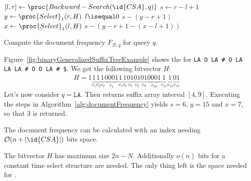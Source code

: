 \begin{algorithm}[htb]
  \begin{codebox}
    \li $[l,r] \gets \proc{Backward-Search(\id{CSA}, q)}$
    \li $s \gets r - l + 1$
    \li $y \gets \proc{Select}_1(r, H)$
    \li \If $l \isequal 0$
        \Then
    \li   \Return $s - (y - r + 1)$
    \li \Else
    \li   $x \gets \proc{Select}_1(l, H)$
    \li   \Return $s - (y - r + 1 - (x - l + 1))$
        \End
  \end{codebox}
  \caption{Compute the document frequency $F_{\mathcal{D},q}$ for query $q$.}
  \label{alg:documentFrequency}
\end{algorithm}

\begin{Example}
  Figure~\ref{fig:binaryGeneralizedSuffixTreeExample} shows the  for \texttt{LA O LA \# O LA LA LA \# O O LA \# \$}. We get the following bitvector $H$:
  \begin{align*}
    H = 1
    \underbrace{1}_{v_1}
    \underbrace{1}_{v_2}
    \underbrace{1}_{v_3}
    \underbrace{0001}_{v_4}
    \underbrace{1}_{v_5}
    \underbrace{1}_{v_6}
    \underbrace{01}_{v_7}
    \underbrace{01}_{v_8}
    \underbrace{01}_{v_9}
    \underbrace{0001}_{v_{10}}
    \underbrace{1}_{v_{11}}
    \underbrace{1}_{v_{12}}
    \underbrace{01}_{v_{13}}
  \end{align*}
  Let's now consider $q = \texttt{LA}$. Then  returns suffix array interval $[4,9]$. Executing the steps in Algorithm~\ref{alg:documentFrequency} yields $s = 6$, $y = 15$ and $x = 7$, so that $3$ is returned.
\end{Example}

\begin{Theorem}
  The document frequency can be calculated with an index needing $\mathcal{O}(n + \vert \id{CSA} \vert)$ bits space.
\end{Theorem}

\begin{Proof}
  The bitvector $H$ has maximum size $2n - N$. Additionally $o(n)$ bits for a constant time select structure are needed. The only thing left is the space needed for .
\end{Proof}
